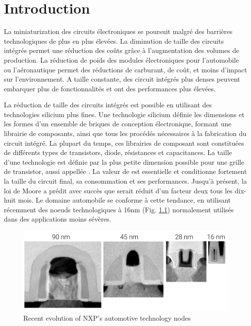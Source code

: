 \chapter{Introduction}

La miniaturization des circuits électroniques se poursuit malgré des barrières technologiques de plus en plus élevées.
La diminution de taille des circuits intégrés permet une réduction des coûts grâce à l'augmentation des volumes de production.
La réduction de poids des modules électroniques pour l'automobile ou l'aéronautique permet des réductions de carburant, de coût, et moins d'impact sur l'environnement.
A taille constante, des circuit intégrés plus denses peuvent embarquer plus de fonctionnalités et ont des performances plus élevées.

La réduction de taille des circuits intégrés est possible en utilisant des technologies silicium plus fines.
Une technologie silicium définie les dimensions et les formes d'un ensemble de briques de conception électronique, formant une librairie de composants, ainsi que tous les procédés nécessaires à la fabrication du circuit intégré.
La plupart du temps, ces librairies de composant sont constituées de différents types de transistors, diode, résistances et capacitances.
La taille d'une technologie est définie par la plus petite dimension possible pour une grille de transistor, aussi appellée \textlambda.
La valeur de \textlambda est essentielle et conditionne fortement la taille du circuit final, sa consommation et ses performances.
Jusqu'à présent, la loi de Moore a prédit avec succès que \textlambda serait réduit d'un facteur deux tous les dix-huit mois.
Le domaine automobile se conforme à cette tendance, en utilisant récemment des noeuds technologiques à 16nm (Fig. \ref{fig:nxp-techno-increase}) \cite{evolution_technologies} normalement utilisés dans des applications moins sévères.

\begin{figure}[!h]
  \centering
  \includegraphics[width=\textwidth]{src/1/figures/technology_evolution.pdf}
  \caption{Recent evolution of NXP's automotive technology nodes \cite{evolution_technologies}}
  \label{fig:nxp-techno-increase}
\end{figure}

